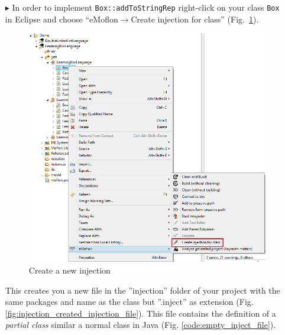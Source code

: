 \begin{enumerate}
    \item[$\blacktriangleright$] In order to implement \texttt{Box::addToStringRep} right-click on your class \texttt{Box} in Eclipse and choose ``eMoflon$\rightarrow$Create injection for class'' (Fig.~\ref{fig:injection_create_injection}).

    \begin{figure}[htbp]
        \centering
        \includegraphics[width=\textwidth]{pics/injectionBilder/create_injection_context_menu.png}
        \caption{Create a new injection}
        \label{fig:injection_create_injection}
    \end{figure}

    This creates you a new file in the ''injection'' folder of your project with the same packages and name as the class but ''.inject'' as extension (Fig. \ref{fig:injection_created_injection_file}). This file contains the definition of a \textit{partial class} similar a normal class in Java (Fig. \ref{code:empty_inject_file}). 


\end{enumerate}
